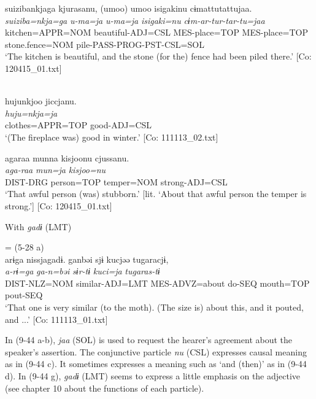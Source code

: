 \ex \label{ex:9.44d} %
 \glll  {\textbar}suiziba{\textbar}nkjaga  kjurasanu,  (umoo)  umoo  isigakinu  cɨmattutattujaa.\\
      \textit{suiziba=nkja=ga}  \textit{}  \textit{u-ma=ja}  \textit{u-ma=ja}  \textit{isigaki=nu}  \textit{cɨm-ar-tur-tar-tu=jaa}\\
      kitchen=APPR=NOM  beautiful-ADJ=CSL  MES-place=TOP   MES-place=TOP  stone.fence=NOM  pile-PASS-PROG-PST-CSL=SOL      \\
      \glt       ‘The kitchen is beautiful, and the stone (for the) fence had been piled there.’ [Co: 120415\_01.txt]

\ex{}\\
    \glll  hujunkjoo  jiccjanu.\\
      \textit{huju=nkja=ja}  \textit{}\\
      clothes=APPR=TOP  good-ADJ=CSL\\
      \glt       ‘(The fireplace was) good in winter.’ [Co: 111113\_02.txt]

\ex %
 \glll  agaraa  munna  kisjoonu  cjussanu.\\
      \textit{aga-raa}  \textit{mun=ja}  \textit{kisjoo=nu}  \textit{}\\
      DIST-DRG  person=TOP  temper=NOM  strong-ADJ=CSL\\
      \glt       ‘That awful person (was) stubborn.’ [lit. ‘About that awful person the temper is strong.’] [Co: 120415\_01.txt]

\exi{}  With \textit{gadɨ} (LMT)

\ex{} = (5-28 a)\\
    \glll  arɨga  nissjagadɨ.  ganbəi  sjɨ  kucjəə  tugaracjɨ,\\
      \textit{a-rɨ=ga}  \textit{}  \textit{ga-n=bəi}  \textit{sɨr-tɨ}   \textit{kuci=ja}  \textit{tugaras-tɨ}\\
      DIST-NLZ=NOM  similar-ADJ=LMT  MES-ADVZ=about  do-SEQ  mouth=TOP  pout-SEQ      \\
      \glt       ‘That one is very similar (to the moth). (The size is) about this, and it pouted, and ...’ [Co: 111113\_01.txt]
    \z
\z

In (9-44 a-b), \textit{jaa} (SOL) is used to request the hearer’s agreement about the speaker’s assertion. The conjunctive particle \textit{nu} (CSL) expresses causal meaning as in (9-44 c). It sometimes expresses a meaning such as ‘and (then)’ as in (9-44 d). In (9-44 g), \textit{gadɨ} (LMT) seems to express a little emphasis on the adjective (see chapter 10 about the functions of each particle).

